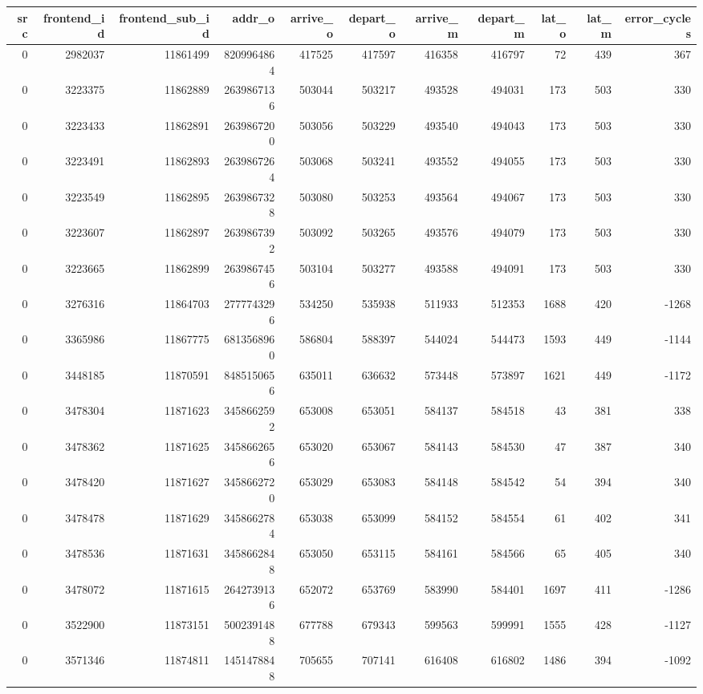 \begin{tabular}{rrrrrrrrrrr}
\toprule
src & frontend\_id & frontend\_sub\_id & addr\_o & arrive\_o & depart\_o & arrive\_m & depart\_m & lat\_o & lat\_m & error\_cycles \\
\midrule
0 & 2982037 & 11861499 & 8209964864 & 417525 & 417597 & 416358 & 416797 & 72 & 439 & 367 \\
0 & 3223375 & 11862889 & 2639867136 & 503044 & 503217 & 493528 & 494031 & 173 & 503 & 330 \\
0 & 3223433 & 11862891 & 2639867200 & 503056 & 503229 & 493540 & 494043 & 173 & 503 & 330 \\
0 & 3223491 & 11862893 & 2639867264 & 503068 & 503241 & 493552 & 494055 & 173 & 503 & 330 \\
0 & 3223549 & 11862895 & 2639867328 & 503080 & 503253 & 493564 & 494067 & 173 & 503 & 330 \\
0 & 3223607 & 11862897 & 2639867392 & 503092 & 503265 & 493576 & 494079 & 173 & 503 & 330 \\
0 & 3223665 & 11862899 & 2639867456 & 503104 & 503277 & 493588 & 494091 & 173 & 503 & 330 \\
0 & 3276316 & 11864703 & 2777743296 & 534250 & 535938 & 511933 & 512353 & 1688 & 420 & -1268 \\
0 & 3365986 & 11867775 & 6813568960 & 586804 & 588397 & 544024 & 544473 & 1593 & 449 & -1144 \\
0 & 3448185 & 11870591 & 8485150656 & 635011 & 636632 & 573448 & 573897 & 1621 & 449 & -1172 \\
0 & 3478304 & 11871623 & 3458662592 & 653008 & 653051 & 584137 & 584518 & 43 & 381 & 338 \\
0 & 3478362 & 11871625 & 3458662656 & 653020 & 653067 & 584143 & 584530 & 47 & 387 & 340 \\
0 & 3478420 & 11871627 & 3458662720 & 653029 & 653083 & 584148 & 584542 & 54 & 394 & 340 \\
0 & 3478478 & 11871629 & 3458662784 & 653038 & 653099 & 584152 & 584554 & 61 & 402 & 341 \\
0 & 3478536 & 11871631 & 3458662848 & 653050 & 653115 & 584161 & 584566 & 65 & 405 & 340 \\
0 & 3478072 & 11871615 & 2642739136 & 652072 & 653769 & 583990 & 584401 & 1697 & 411 & -1286 \\
0 & 3522900 & 11873151 & 5002391488 & 677788 & 679343 & 599563 & 599991 & 1555 & 428 & -1127 \\
0 & 3571346 & 11874811 & 1451478848 & 705655 & 707141 & 616408 & 616802 & 1486 & 394 & -1092 \\

\end{tabular}
